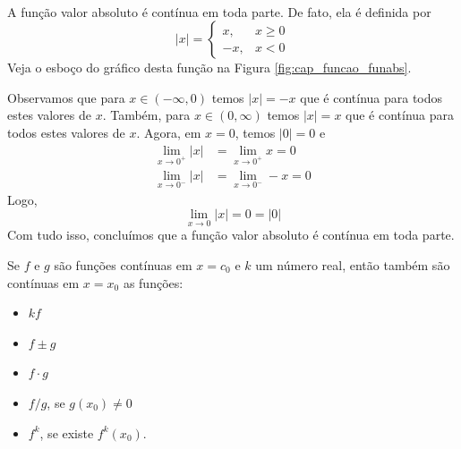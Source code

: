\cleardoublepage\documentclass[../main.tex]{subfiles}
\begin{document}
\newpage
{}
\begin{ex}~
 \\ A função valor absoluto é contínua em toda parte. De fato, ela é definida por
  \begin{equation*}
    |x| = \left\{
      \begin{array}{ll}
        x, & x\geq 0\\
        -x, & x<0
      \end{array}
    \right.
  \end{equation*}
  Veja o esboço do gráfico desta função na Figura \ref{fig:cap_funcao_funabs}.
  
  Observamos que para $x\in(-\infty, 0)$ temos $|x| = -x$ que é contínua para todos estes valores de $x$. Também, para $x\in(0,\infty)$ temos $|x|=x$ que é contínua para todos estes valores de $x$. Agora, em $x=0$, temos $|0|=0$ e
  \begin{align*}
    \lim_{x\to 0^+} |x| &= \lim_{x\to 0^+} x = 0\\
    \lim_{x\to 0^-} |x| &= \lim_{x\to 0^-} -x = 0
  \end{align*}
  Logo,
  \begin{equation*}
    \lim_{x\to 0} |x| = 0 = |0|
  \end{equation*}
  Com tudo isso, concluímos que a função valor absoluto é contínua em toda parte.
\end{ex}

\begin{framed}\begin{prop}
  Se $f$ e $g$ são funções contínuas em $x=c_0$ e $k$ um número real, então também são contínuas em $x=x_0$ as funções:
  \begin{multicols}{2}
  \begin{itemize}
  \item $kf$
  \item $f\pm g$
  \item $f\cdot g$
  \item $f/g$, se $g(x_0)\neq 0$
  \item $f^k$, se existe $f^k(x_0)$.
  \end{itemize}\end{multicols}
\end{prop}\end{framed}
\end{document}
